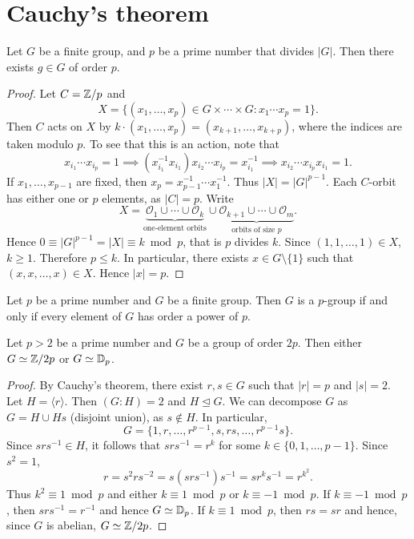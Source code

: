\section{Cauchy's theorem}

\begin{theorem}[Cauchy]
\label{thm:Cauchy}
Let $G$ be a finite group, and $p$ be a prime number
that divides $|G|$. 
Then there exists $g\in G$ of order $p$.
\end{theorem}

\begin{proof}
Let $C=\mathbb{Z}/p$ and 
\[
X=\{(x_1,\dots,x_p)\in G\times\cdots\times G:x_1\cdots x_p=1\}.
\]
Then $C$ acts on $X$ by $k\cdot (x_1,\dots,x_p)=(x_{k+1},\dots,x_{k+p})$, where the indices are taken modulo $p$. To see that
this is an action, note that 
\[
x_{i_1}\cdots x_{i_p}=1
\implies (x_{i_1}^{-1}x_{i_1})x_{i_2}\cdots x_{i_p}=x_{i_1}^{-1}
\implies x_{i_2}\cdots x_{i_p}x_{i_1}=1.
\]
If $x_1,\dots,x_{p-1}$ are fixed, then 
$x_p=x_{p-1}^{-1}\cdots x_{1}^{-1}$. Thus $|X|=|G|^{p-1}$. Each $C$-orbit
has either one or $p$ elements, as $|C|=p$. Write
\[
X=\underbrace{\mathcal{O}_1\cup\cdots\cup \mathcal{O}_k}_{\text{one-element orbits}}\cup\underbrace{\mathcal{O}_{k+1}\cup\cdots\cup\mathcal{O}_m}_{\text{orbits of size $p$}}.
\]
Hence $0\equiv |G|^{p-1}=|X|\equiv k\bmod p$, that is $p$ divides $k$. Since $(1,1,\dots,1)\in X$, $k\geq 1$. Therefore $p\leq k$. In particular,
there exists $x\in G\setminus\{1\}$ such that $(x,x,\dots,x)\in X$. Hence $|x|=p$.
\end{proof}

\begin{exercise}
\label{xca:p_groups}
    Let $p$ be a prime number and $G$ be a finite group. 
    Then $G$ is a $p$-group if and only if 
    every element of $G$ has order a power of $p$. 
\end{exercise}

\begin{corollary}
    Let $p>2$ be a prime number 
    and $G$ be a group of order $2p$. 
    Then either $G\simeq\mathbb{Z}/2p$ or $G\simeq\mathbb{D}_p$.
\end{corollary}

\begin{proof}
    By Cauchy's theorem, there exist $r,s\in G$ such that
    $|r|=p$ and $|s|=2$. Let $H=\langle r\rangle$. Then
    $(G:H)=2$ and $H\unlhd G$. We can decompose $G$ as 
    $G=H\cup Hs$ (disjoint union), 
    as $s\not\in H$. In particular, 
\[
G=\{1,r,\dots,r^{p-1},s,rs,\dots,r^{p-1}s\}.
\]
Since $srs^{-1}\in H$, it follows that $srs^{-1}=r^k$ for some
$k\in\{0,1,\dots,p-1\}$. Since $s^2=1$,
\[
r=s^2rs^{-2}=s(srs^{-1})s^{-1}=sr^ks^{-1}=r^{k^2}.
\]
Thus $k^2\equiv 1\bmod p$ and either 
$k\equiv 1\bmod p$ or $k\equiv-1\bmod p$. 
If $k\equiv -1\bmod p$, then $srs^{-1}=r^{-1}$ and hence $G\simeq\mathbb{D}_p$.
If $k\equiv 1\bmod p$, then $rs=sr$ and hence, since $G$ is abelian, $G\simeq\mathbb{Z}/{2p}$.
\end{proof}

